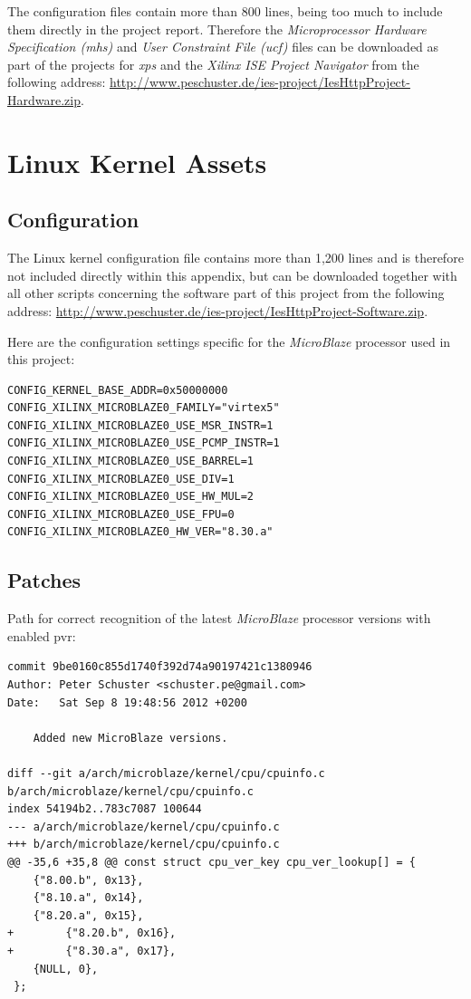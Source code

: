 The configuration files contain more than 800 lines, being too much to include them directly in the project report. Therefore the \textit{Microprocessor Hardware Specification (mhs)} and \textit{User Constraint File (ucf)} files can be downloaded as part of the projects for \textit{\gls{xps}} and the \textit{Xilinx ISE Project Navigator} from the following address: \url{http://www.peschuster.de/ies-project/IesHttpProject-Hardware.zip}.
\\

\section{Linux Kernel Assets}

\subsection{Configuration}

The Linux kernel configuration file contains more than 1,200 lines and is therefore not included directly within this appendix, but can be downloaded together with all other scripts concerning the software part of this project from the following address: \url{http://www.peschuster.de/ies-project/IesHttpProject-Software.zip}.

Here are the configuration settings specific for the \textit{MicroBlaze} processor used in this project:

\begin{verbatim}
CONFIG_KERNEL_BASE_ADDR=0x50000000
CONFIG_XILINX_MICROBLAZE0_FAMILY="virtex5"
CONFIG_XILINX_MICROBLAZE0_USE_MSR_INSTR=1
CONFIG_XILINX_MICROBLAZE0_USE_PCMP_INSTR=1
CONFIG_XILINX_MICROBLAZE0_USE_BARREL=1
CONFIG_XILINX_MICROBLAZE0_USE_DIV=1
CONFIG_XILINX_MICROBLAZE0_USE_HW_MUL=2
CONFIG_XILINX_MICROBLAZE0_USE_FPU=0
CONFIG_XILINX_MICROBLAZE0_HW_VER="8.30.a"
\end{verbatim} 

\subsection{Patches}
\label{subsec:pvr_patch}

Path for correct recognition of the latest \textit{MicroBlaze} processor versions with enabled \gls{pvr}:

\begin{verbatim}
commit 9be0160c855d1740f392d74a90197421c1380946
Author: Peter Schuster <schuster.pe@gmail.com>
Date:   Sat Sep 8 19:48:56 2012 +0200

    Added new MicroBlaze versions.

diff --git a/arch/microblaze/kernel/cpu/cpuinfo.c b/arch/microblaze/kernel/cpu/cpuinfo.c
index 54194b2..783c7087 100644
--- a/arch/microblaze/kernel/cpu/cpuinfo.c
+++ b/arch/microblaze/kernel/cpu/cpuinfo.c
@@ -35,6 +35,8 @@ const struct cpu_ver_key cpu_ver_lookup[] = {
 	{"8.00.b", 0x13},
 	{"8.10.a", 0x14},
 	{"8.20.a", 0x15},
+        {"8.20.b", 0x16},
+        {"8.30.a", 0x17},
 	{NULL, 0},
 };
\end{verbatim}


